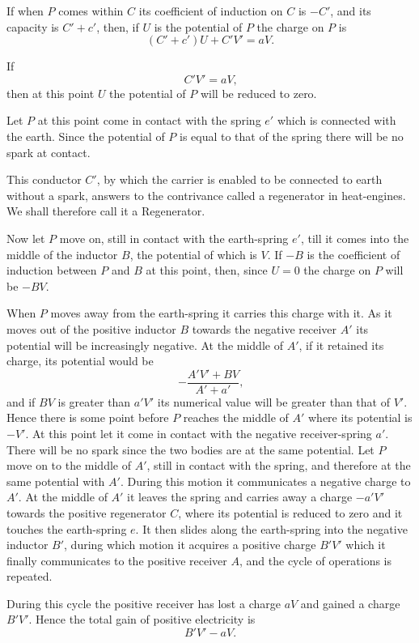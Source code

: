 \documentclass[12pt,oneside]{book}[2021/10/04]
\newcommand{\¬}{\hphantom{0}}
\begin{document}
If when \(P\) comes within \(C\) its coefficient of induction on \(C\) is
\(-C'\), and its capacity is \(C' + c'\), then, if \(U\) is the potential of \(P\)
the charge on \(P\) is
\[
(C'+c')U+C'V'=aV\text{.}\]

If
\[
C'V'=aV\text{,}
\]
then at this point \(U\) the potential of \(P\) will be reduced to zero.

Let \(P\) at this point come in contact with the spring \(e'\) which is
connected with the earth. Since the potential of \(P\) is equal to that
of the spring there will be no spark at contact.

This conductor \(C'\), by which the carrier is enabled to be connected
to earth without a spark, answers to the contrivance called a
regenerator in heat-engines. We shall therefore call it a Regenerator.

Now let \(P\) move on, still in contact with the earth-spring \(e'\), till
it comes into the middle of the inductor \(B\), the potential of which
is \(V\). If \(-B\) is the coefficient of induction between \(P\) and \(B\) at
this point, then, since \(U = 0\) the charge on \(P\) will be \(-BV\).

When \(P\) moves away from the earth-spring it carries this charge
with it. As it moves out of the positive inductor \(B\) towards the
negative receiver \(A'\) its potential will be increasingly negative. At
the middle of \(A'\), if it retained its charge, its potential would be
\[
-\frac{A'V'+BV}{A'+a'}\text{,}
\]
and if \(BV\) is greater than \(a'V'\) its numerical value will be greater
than that of \(V'\). Hence there is some point before \(P\) reaches the
middle of \(A'\) where its potential is \(-V'\). At this point let it come
in contact with the negative receiver-spring \(a'\). There will be no
spark since the two bodies are at the same potential. Let \(P\) move
on to the middle of \(A'\), still in contact with the spring, and therefore
at the same potential with \(A'\). During this motion it communicates
a negative charge to \(A'\). At the middle of \(A'\) it leaves the spring
and carries away a charge \(-a'V'\) towards the positive regenerator
\(C\), where its potential is reduced to zero and it touches the earth-spring
\(e\). It then slides along the earth-spring into the negative
inductor \(B'\), during which motion it acquires a positive charge \(B'V'\)
which it finally communicates to the positive receiver \(A\), and the
cycle of operations is repeated.

During this cycle the positive receiver has lost a charge \(aV\) and
gained a charge \(B'V'\). Hence the total gain of positive electricity
is
\[
B'V' - aV\text{.}
\]
\end{document}
